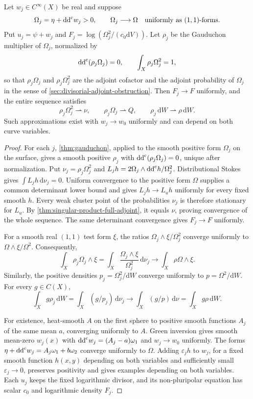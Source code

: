 \begin{proposition}\label{prop:singular-product-adjoint-approximation}
Let $w_j\in C^\infty(X)$ be real and suppose
\[
 \Omega_j=\eta+\mathrm{dd}^{\mathrm{c}} w_j>0,\qquad \Omega_j\longrightarrow\Omega
       \quad\text{uniformly as }(1,1)\text{-forms}.
\]
Put $u_j=\psi+w_j$ and $F_j=\log(\Omega_j^2/(c_0\mathrm{d}V))$. Let $\rho_j$ be the Gauduchon multiplier of $\Omega_j$, normalized by
\[
 \mathrm{dd}^{\mathrm{c}}(\rho_j\Omega_j)=0,\qquad \int_X\rho_j\Omega_j^2=1,
\]
so that $\rho_j\Omega_j$ and $\rho_j\Omega_j^2$ are the adjoint cofactor and the adjoint probability of $\Omega_j$ in the sense of \cref{sec:divisorial-adjoint-obstruction}. Then $F_j\to F$ uniformly, and the entire sequence satisfies
\[
 \rho_j\Omega_j^2\rightharpoonup\nu,\qquad
 \rho_j\Omega_j\rightharpoonup Q,\qquad
 \rho_j\,\mathrm{d}W\rightharpoonup\rho\,\mathrm{d}W.
\]
Such approximations exist with $w_j\to w_0$ uniformly and can depend on both curve variables.
\end{proposition}
\begin{proof}
For each $j$, \cref{thm:gauduchon}, applied to the smooth positive form $\Omega_j$ on the surface, gives a smooth positive $\rho_j$ with $\mathrm{dd}^{\mathrm{c}}(\rho_j\Omega_j)=0$, unique after normalization. Put $\nu_j=\rho_j\Omega_j^2$ and $L_jh=2\Omega_j\wedge\mathrm{dd}^{\mathrm{c}} h/\Omega_j^2$. Distributional Stokes gives $\int L_jh\,\mathrm{d}\nu_j=0$. Uniform convergence to the positive form $\Omega$ supplies a common determinant lower bound and gives $L_jh\to L_uh$ uniformly for every fixed smooth $h$. Every weak cluster point of the probabilities $\nu_j$ is therefore stationary for $L_u$. By \cref{thm:singular-product-full-adjoint}, it equals $\nu$, proving convergence of the whole sequence. The same determinant convergence gives $F_j\to F$ uniformly.

For a smooth real $(1,1)$ test form $\xi$, the ratios $\Omega_j\wedge\xi/\Omega_j^2$ converge uniformly to $\Omega\wedge\xi/\Omega^2$. Consequently,
\[
 \int_X\rho_j\Omega_j\wedge\xi
    =\int_X\frac{\Omega_j\wedge\xi}{\Omega_j^2}\,\mathrm{d}\nu_j
    \longrightarrow\int_X\rho\Omega\wedge\xi.
\]
Similarly, the positive densities $p_j=\Omega_j^2/\mathrm{d}W$ converge uniformly to $p=\Omega^2/\mathrm{d}W$. For every $g\in C(X)$,
\[
 \int_Xg\rho_j\,\mathrm{d}W
    =\int_X(g/p_j)\,\mathrm{d}\nu_j
    \longrightarrow\int_X(g/p)\,\mathrm{d}\nu
    =\int_Xg\rho\,\mathrm{d}W.
\]

For existence, heat-smooth $A$ on the first sphere to positive smooth functions $A_j$ of the same mean $a$, converging uniformly to $A$. Green inversion gives smooth mean-zero $w_j(x)$ with $\mathrm{dd}^{\mathrm{c}} w_j=(A_j-a)\omega_1$ and $w_j\to w_0$ uniformly. The forms $\eta+\mathrm{dd}^{\mathrm{c}} w_j=A_j\omega_1+b\omega_2$ converge uniformly to $\Omega$. Adding $\varepsilon_jh$ to $w_j$, for a fixed smooth function $h(x,y)$ depending on both variables and sufficiently small $\varepsilon_j\to0$, preserves positivity and gives examples depending on both variables. Each $u_j$ keeps the fixed logarithmic divisor, and its non-pluripolar equation has scalar $c_0$ and logarithmic density $F_j$.
\end{proof}

